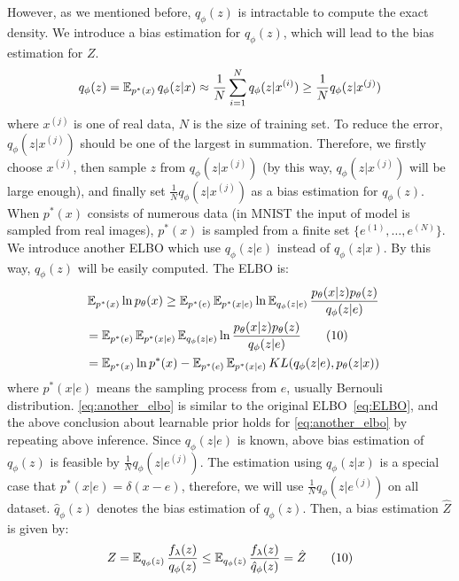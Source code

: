 However, as we mentioned before, $q_\phi(z)$ is intractable to compute the exact density. We introduce a bias estimation for $q_\phi(z)$, which will lead to the bias estimation for $Z$. 
\begin{equation*}
	q_\phi(z) = \operatorname{\mathbb{E}}_{p^*(x)} q_\phi(z|x) \approx \frac{1}{N}\sum_{i=1}^N q_\phi(z|x^{(i)}) \geq \frac{1}{N} q_\phi(z|x^{(j)})
\end{equation*}
where $x^{(j)}$ is one of real data, $N$ is the size of training set. To reduce the error, $q_\phi(z|x^{(j)})$ should be one of the largest in summation. Therefore, we firstly choose $x^{(j)}$, then sample $z$ from $q_\phi(z|x^{(j)})$ (by this way, $q_\phi(z|x^{(j)})$ will be large enough), and finally set $\frac{1}{N} q_\phi(z|x^{(j)})$ as a bias estimation for $q_\phi(z)$. When $p^*(x)$ consists of numerous data (\EG in MNIST the input of model is sampled from real images), $p^*(x)$ is sampled from a finite set $\{e^{(1)}, \ldots, e^{(N)}\}$. We introduce another ELBO which use $q_\phi(z|e)$ instead of $q_\phi(z|x)$. By this way, $q_\phi(z)$ will be easily computed. The ELBO is:
\begin{align*}~\label{eq:another_elbo}
	&\operatorname{\mathbb{E}}_{p^*(x)} \ln p_\theta(x) \geq \operatorname{\mathbb{E}}_{p^*(e)} \operatorname{\mathbb{E}}_{p^*(x|e)} \ln \operatorname{\mathbb{E}}_{q_\phi(z|e)} \frac{p_\theta(x|z)p_\theta(z)}{q_\phi(z|e)} \\
	 &= \operatorname{\mathbb{E}}_{p^*(e)} \operatorname{\mathbb{E}}_{p^*(x|e)} \operatorname{\mathbb{E}}_{q_\phi(z|e)} \ln \frac{p_\theta(x|z)p_\theta(z)}{q_\phi(z|e)} \tag{10} \\
	 &= \operatorname{\mathbb{E}}_{p^*(x)} \ln p^*(x) - \operatorname{\mathbb{E}}_{p^*(e)} \operatorname{\mathbb{E}}_{p^*(x|e)} KL(q_\phi(z|e), p_\theta(z|x))
\end{align*} 
where $p^*(x|e)$ means the sampling process from $e$, usually Bernouli distribution. \cref{eq:another_elbo} is similar to the original ELBO~\cref{eq:ELBO}, and the above conclusion about learnable prior holds for \cref{eq:another_elbo} by repeating above inference. %
Since $q_\phi(z|e)$ is known, above bias estimation of $q_\phi(z)$ is feasible by $\frac{1}{N} q_\phi(z|e^{(j)})$. The estimation using $q_\phi(z|x)$ is a special case that $p^*(x|e) = \delta(x - e)$, therefore, we will use $\frac{1}{N} q_\phi(z|e^{(j)})$ on all dataset. $\hat{q}_\phi(z)$ denotes the bias estimation of $q_\phi(z)$. Then, a bias estimation $\hat{Z}$ is given by:
\begin{align*}\label{eq:Z_estimator}
	Z = \operatorname{\mathbb{E}}_{q_\phi(z)}\frac{f_\lambda(z)}{q_\phi(z)} \leq \operatorname{\mathbb{E}}_{q_\phi(z)} \frac{f_\lambda(z)}{\hat{q}_\phi(z)} = \hat{Z} \tag{10}
\end{align*}


